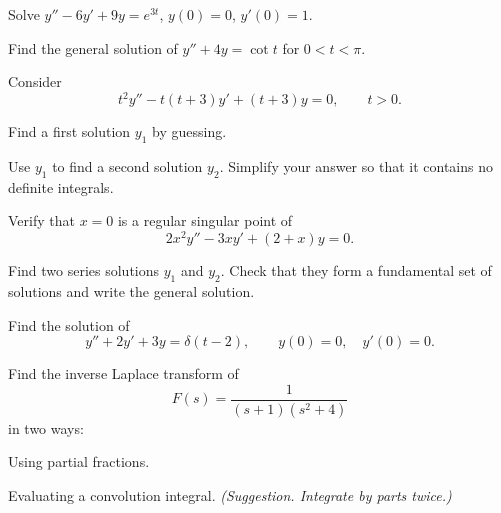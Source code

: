 \documentclass[11pt,oneside]{article}
\begin{document}
\begin{problem}
Solve $y''-6y'+9y=e^{3t}$, $y(0)=0$, $y'(0)=1$.
\end{problem}

\begin{problem}
Find the general solution of $y''+4y=\cot t$ for $0<t<\pi$.
\end{problem}

\begin{problem}
Consider
\[
t^2y''-t(t+3)y'+(t+3)y=0,\qquad t>0.
\]
\begin{problemsubparts}
\item Find a first solution $y_1$ by guessing.
\item Use $y_1$ to find a second solution $y_2$. Simplify your answer so that it contains no definite integrals.
\end{problemsubparts}
\end{problem}

\begin{problem}
\begin{problemsubparts}
\item Verify that $x=0$ is a regular singular point of
\[
2x^2y''-3xy'+(2+x)y=0.
\]
\item Find two series solutions $y_1$ and $y_2$. Check that they form a fundamental set of solutions and write the general solution.
\end{problemsubparts}
\end{problem}

\begin{problem}
Find the solution of
\[
y''+2y'+3y=\delta(t-2),\qquad y(0)=0,\quad y'(0)=0.
\]
\end{problem}

\begin{problem}
Find the inverse Laplace transform of
\[
F(s)=\frac{1}{(s+1)(s^2+4)}
\]
in two ways:
\begin{problemsubparts}
\item Using partial fractions.
\item Evaluating a convolution integral. \textit{(Suggestion. Integrate by parts twice.)}
\end{problemsubparts}
\end{problem}
\end{document}
